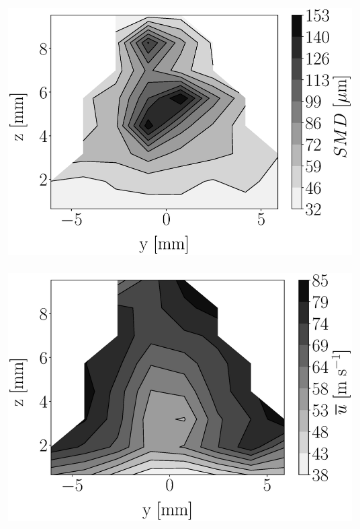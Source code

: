 

\begin{figure}[h!]
\flushleft
\begin{subfigure}[b]{0.22\textwidth}
	\centering
   \includegraphics[scale=0.17]{./part2_developments/figures_ch5_resolved_JICF/injectors_SLI/uG100_dx10_x10_SMD_map.eps}
\end{subfigure}
   \hspace{0.17in}
\begin{subfigure}[b]{0.22\textwidth}
	\centering
   \includegraphics[scale=0.17]{./part2_developments/figures_ch5_resolved_JICF/injectors_SLI/uG100_dx10_x10_ux_mean_map.eps}

\end{subfigure}
\end{figure}
